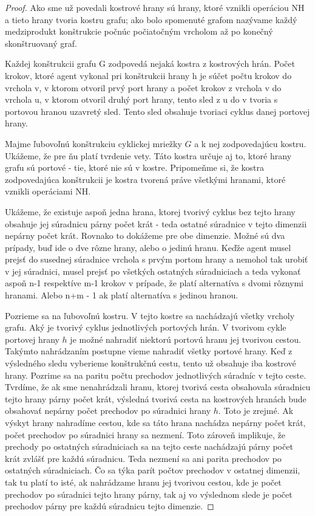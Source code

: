\begin{proof}
Ako sme už povedali kostrové hrany sú hrany, ktoré vznikli operáciou NH a
tieto hrany tvoria kostru grafu; ako bolo spomenuté grafom nazývame každý
medziprodukt konštrukcie počnúc počiatočným vrcholom až po konečný
skonštruovaný graf.

Každej konštrukcii grafu G zodpovedá nejaká kostra z kostrových hrán. Počet
krokov, ktoré agent vykonal pri konštrukcii hrany h je súčet počtu krokov do
vrchola v, v ktorom otvoril prvý port hrany a počet krokov z vrchola v do
vrchola u, v ktorom otvoril druhý port hrany, 
tento sled z u do v tvoria s portovou
hranou uzavretý sled. Tento sled obsahuje tvoriaci cyklus danej portovej
hrany.

Majme ľubovoľnú konštrukciu cyklickej mriežky $G$ a k nej zodpovedajúcu
kostru. Ukážeme, že pre ňu platí tvrdenie vety.
Táto kostra určuje aj to, ktoré hrany grafu sú portové - tie, ktoré nie sú v
kostre. Pripomeňme si, že kostra zodpovedajúca konštrukcii je kostra tvorená
práve všetkými hranami, ktoré vznikli operáciami NH.

Ukážeme, že existuje aspoň jedna hrana, ktorej tvorivý cyklus bez tejto
hrany obsahuje jej
súradnicu párny počet krát - teda ostatné súradnice v tejto dimenzii nepárny
počet krát. Rovnako to dokážeme pre obe dimenzie. Možné sú dva prípady, buď
ide o dve rôzne hrany, alebo o jedinú hranu.
Keďže agent musel prejsť do susednej súradnice vrchola s prvým portom hrany
a nemohol tak urobiť v jej súradnici, musel prejsť po všetkých ostatných
súradniciach a teda vykonať aspoň n-1 respektíve m-1 krokov v prípade, že
platí alternatíva s dvomi rôznymi hranami. Alebo n+m - 1 ak platí
alternatíva s jedinou hranou. 

Pozrieme sa na ľubovoľnú kostru. V tejto kostre sa nachádzajú všetky vrcholy
grafu. Aký je tvorivý cyklus jednotlivých portových hrán. V tvorivom cykle
portovej hrany $h$
je možné nahradiť niektorú portovú hranu jej tvorivou cestou. Takýmto
nahrádzaním postupne vieme nahradiť všetky portové hrany. Keď z výsledného
sledu vyberieme konštrukčnú cestu, tento už obsahuje iba kostrové hrany.
Pozrime sa na paritu počtu prechodov jednotlivých súradníc v tejto ceste.
Tvrdíme, že ak sme nenahrádzali hranu, ktorej tvorivá cesta obsahovala
súradnicu tejto hrany párny počet krát, výsledná tvorivá cesta na
kostrových hranách bude obsahovať nepárny počet prechodov po súradnici 
hrany $h$.
Toto je zrejmé. Ak výskyt hrany nahradíme cestou, kde sa táto hrana nachádza
nepárny počet krát, počet prechodov po súradnici hrany sa nezmení. Toto
zároveň implikuje, že prechody po ostatných súradniciach sa na tejto ceste
nachádzajú párny počet krát zvlášť pre každú súradnicu. Teda nezmení sa ani
parita prechodov po ostatných súradniciach.
Čo sa týka parít počtov prechodov v ostatnej dimenzii, tak tu platí to isté,
ak nahrádzame hranu jej tvorivou cestou, kde je počet prechodov po súradnici
tejto hrany párny, tak aj vo výslednom slede je počet prechodov párny pre každú
súradnicu tejto dimenzie.


\end{proof}
